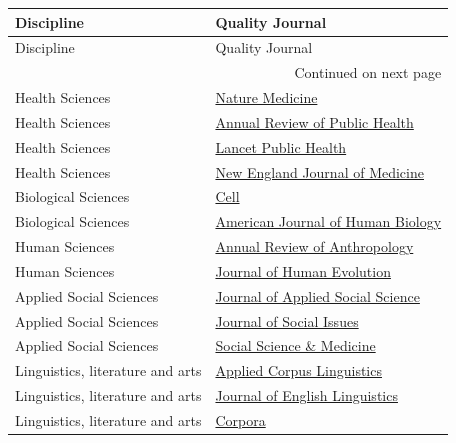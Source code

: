 {\scriptsize
\begin{longtable}{ll}
\toprule
Discipline & Quality Journal \\
\midrule
\endfirsthead
\toprule
Discipline & Quality Journal \\
\midrule
\endhead
\midrule
\multicolumn{2}{r}{Continued on next page} \\
\midrule
\endfoot
\bottomrule
\endlastfoot
Health Sciences & \href{https://www.nature.com/nm/}{Nature Medicine} \\
Health Sciences & \href{https://www.annualreviews.org/content/journals/publhealth}{Annual Review of Public Health} \\
Health Sciences & \href{https://www.thelancet.com/journals/lanpub/home}{Lancet Public Health} \\
Health Sciences & \href{https://www.nejm.org/}{New England Journal of Medicine} \\
Biological Sciences & \href{https://www.cell.com/cell/home}{Cell} \\
Biological Sciences & \href{https://onlinelibrary.wiley.com/journal/15206300?msockid=0525cb73d9a76a060b80df20d87e6b4b}{American Journal of Human Biology} \\
Human Sciences & \href{https://www.annualreviews.org/content/journals/anthro}{Annual Review of Anthropology} \\
Human Sciences & \href{https://www.sciencedirect.com/journal/journal-of-human-evolution}{Journal of Human Evolution} \\
Applied Social Sciences & \href{https://journals.sagepub.com/home/jax}{Journal of Applied Social Science} \\
Applied Social Sciences & \href{https://spssi.onlinelibrary.wiley.com/journal/15404560}{Journal of Social Issues} \\
Applied Social Sciences & \href{https://www.sciencedirect.com/journal/social-science-and-medicine}{Social Science \& Medicine} \\
Linguistics, literature and arts & \href{https://www.sciencedirect.com/journal/applied-corpus-linguistics}{Applied Corpus Linguistics} \\
Linguistics, literature and arts & \href{https://journals.sagepub.com/home/eng}{Journal of English Linguistics} \\
Linguistics, literature and arts & \href{https://www.euppublishing.com/journal/cor}{Corpora} \\
\end{longtable}
}
